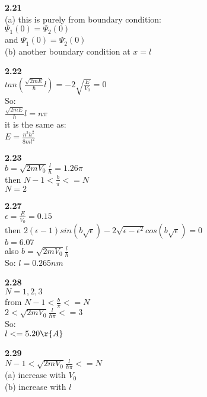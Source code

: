 \documentclass{article}
\begin{document}
\textbf{2.21}\\
(a) this is purely from boundary condition:\\
$\Psi_1(0) = \Psi_2(0)$\\
and $\Psi^,_1(0) = \Psi^,_2(0)$\\
(b) another boundary condition at $x = l$\\
\newline

\textbf{2.22}\\
$tan(\frac{\sqrt{2mE}}{\hbar}l) = -2\sqrt{\frac{E}{V_0}} = 0$\\
So:\\
$\frac{\sqrt{2mE}}{\hbar}l = n\pi$\\
it is the same as:\\
$E = \frac{n^2h^2}{8ml^2}$\\
\newline

\textbf{2.23}\\
$b = \sqrt{2mV_0}\frac{l}{\hbar} = 1.26\pi$\\
then $N - 1 < \frac{b}{\pi} <= N$\\
$N = 2$\\
\newline

\textbf{2.27}\\
$\epsilon = \frac{E}{V_0} = 0.15$\\
then $2(\epsilon - 1)sin(b\sqrt{\epsilon})-2\sqrt{\epsilon - \epsilon^2}cos(b\sqrt{\epsilon}) = 0$\\
$b = 6.07$\\
also $b = \sqrt{2mV_0}\frac{l}{\hbar}$\\
So: $l = 0.265nm$\\
\newline

\textbf{2.28}\\
$N = 1,2,3$\\
from $N - 1 < \frac{b}{\pi} <= N$\\
$2 < \sqrt{2mV_0}\frac{l}{\hbar\pi} <= 3$\\
So:\\
$l <= 5.20 \r{A}$\\
\newline

\textbf{2.29}\\
$N-1 < \sqrt{2mV_0}\frac{l}{\hbar\pi} <= N$\\
(a) increase with $V_0$\\
(b) increase with $l$\\
\newline
\end{document}
